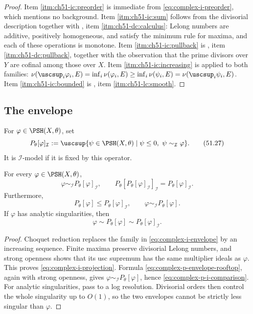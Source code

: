 \begin{proof}
Item \cref{itm:ch51-ic:preorder} is immediate from
\eqref{eq:complex-i-preorder}, which mentions no background.  Item
\cref{itm:ch51-ic:sum} follows from the divisorial description together
with , item
\cref{itm:ch51-dc:calculus}: Lelong numbers are additive, positively
homogeneous, and satisfy the minimum rule for maxima, and each of these
operations is monotone.  Item \cref{itm:ch51-ic:pullback} is
, item \cref{itm:ch51-dc:pullback},
together with the observation that the prime divisors over \(Y\) are
cofinal among those over \(X\).  Item \cref{itm:ch51-ic:increasing} is
 applied to both families:
\(\nu(\uscsup_i\varphi_i,E)=\inf_i\nu(\varphi_i,E)
\geq\inf_i\nu(\psi_i,E)=\nu(\uscsup_i\psi_i,E)\).  Item
\cref{itm:ch51-ic:bounded} is , item
\cref{itm:ch51-lc:smooth}.
\end{proof}

\subsection{The envelope}
\label{sec:ch51-i-envelope-def}

\begin{definition}
\label{def:complex-i-envelope}
For \(\varphi\in\PSH(X,\theta)\), set
\[
 P_\theta[\varphi]_{\mathcal I}
 :=\uscsup\{\psi\in\PSH(X,\theta)\mid
          \psi\leq0,\ \psi\sim_{\mathcal I}\varphi\}.
\tag{51.27}\label{eq:complex-i-envelope}
\]
It is \(\mathcal I\)-model if it is fixed by this operator.
\end{definition}

\begin{theorem}\label{thm:complex-i-projection}
For every \(\varphi\in\PSH(X,\theta)\),
\[
 \varphi\sim_{\mathcal I}P_\theta[\varphi]_{\mathcal I},
\qquad
 P_\theta[P_\theta[\varphi]_{\mathcal I}]_{\mathcal I}
      =P_\theta[\varphi]_{\mathcal I}.
\tag{51.28}\label{eq:complex-i-projection}
\]
Furthermore,
\[
 P_\theta[\varphi]\leq P_\theta[\varphi]_{\mathcal I},
\qquad
 \varphi\sim_{\mathcal I}P_\theta[\varphi].
\tag{51.29}\label{eq:complex-p-i-comparison}
\]
If \(\varphi\) has analytic singularities, then
\[
 \varphi\sim P_\theta[\varphi]
        \sim P_\theta[\varphi]_{\mathcal I}.
\tag{51.30}\label{eq:complex-analytic-envelope-agreement}
\]
\end{theorem}

\begin{proof}
Choquet reduction replaces the family in
\eqref{eq:complex-i-envelope} by an increasing sequence.  Finite maxima
preserve divisorial Lelong numbers, and strong openness shows that its
usc supremum has the same multiplier ideals as \(\varphi\).  This proves
\eqref{eq:complex-i-projection}.  Formula
\eqref{eq:complex-p-envelope-rooftop}, again with strong openness, gives
\(\varphi\sim_{\mathcal I}P_\theta[\varphi]\), hence
\eqref{eq:complex-p-i-comparison}.  For analytic singularities, pass to
a log resolution.  Divisorial orders then control the whole singularity
up to \(O(1)\), so the two envelopes cannot be strictly less singular
than \(\varphi\).
\end{proof}

